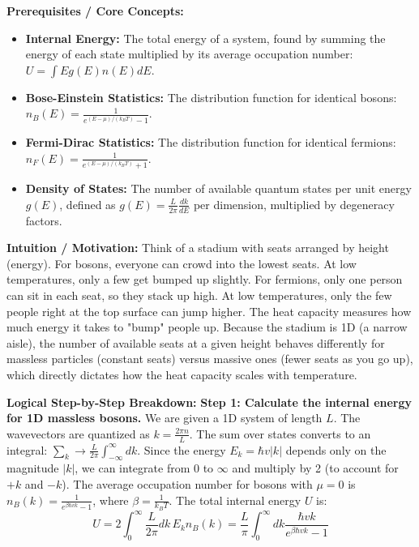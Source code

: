 \begin{solution}
\textbf{Prerequisites / Core Concepts:}
\begin{itemize}
    \item \textbf{Internal Energy:} The total energy of a system, found by summing the energy of each state multiplied by its average occupation number: $U = \int E g(E) n(E) dE$.
    \item \textbf{Bose-Einstein Statistics:} The distribution function for identical bosons: $n_B(E) = \frac{1}{e^{(E-\mu)/(k_B T)} - 1}$.
    \item \textbf{Fermi-Dirac Statistics:} The distribution function for identical fermions: $n_F(E) = \frac{1}{e^{(E-\mu)/(k_B T)} + 1}$.
    \item \textbf{Density of States:} The number of available quantum states per unit energy $g(E)$, defined as $g(E) = \frac{L}{2\pi} \frac{dk}{dE}$ per dimension, multiplied by degeneracy factors.
\end{itemize}

\textbf{Intuition / Motivation:}
Think of a stadium with seats arranged by height (energy). For bosons, everyone can crowd into the lowest seats. At low temperatures, only a few get bumped up slightly. For fermions, only one person can sit in each seat, so they stack up high. At low temperatures, only the few people right at the top surface can jump higher. The heat capacity measures how much energy it takes to "bump" people up. Because the stadium is 1D (a narrow aisle), the number of available seats at a given height behaves differently for massless particles (constant seats) versus massive ones (fewer seats as you go up), which directly dictates how the heat capacity scales with temperature.

\textbf{Logical Step-by-Step Breakdown:}
\textbf{Step 1: Calculate the internal energy for 1D massless bosons.}
We are given a 1D system of length $L$. The wavevectors are quantized as $k = \frac{2\pi n}{L}$. The sum over states converts to an integral: $\sum_k \to \frac{L}{2\pi} \int_{-\infty}^{\infty} dk$. Since the energy $E_k = \hbar v |k|$ depends only on the magnitude $|k|$, we can integrate from $0$ to $\infty$ and multiply by 2 (to account for $+k$ and $-k$).
The average occupation number for bosons with $\mu = 0$ is $n_B(k) = \frac{1}{e^{\beta \hbar v k} - 1}$, where $\beta = \frac{1}{k_B T}$.
The total internal energy $U$ is:
\begin{equation*}
    U = 2 \int_0^\infty \frac{L}{2\pi} dk \, E_k n_B(k) = \frac{L}{\pi} \int_0^\infty dk \frac{\hbar v k}{e^{\beta \hbar v k} - 1}
\end{equation*}


\end{solution}
